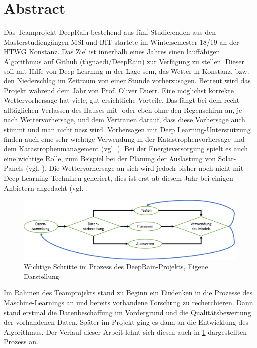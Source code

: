 
\section{Abstract}
Das Teamprojekt DeepRain bestehend aus fünf Studierenden aus den Masterstudiengängen MSI und BIT startete im Wintersemester 18/19 an der HTWG Konstanz. Das Ziel ist innerhalb eines Jahres einen lauffähigen Algorithmus auf Github (thgnaedi/DeepRain) zur Verfügung zu stellen. Dieser soll mit Hilfe von Deep Learning in der Lage sein, das Wetter in Konstanz, bzw. den Niederschlag im Zeitraum von einer Stunde vorherzusagen. Betreut wird das Projekt während dem Jahr von Prof. Oliver Duerr. 
Eine möglichst korrekte Wettervorhersage hat viele, gut ersichtliche Vorteile. Das fängt bei dem recht alltäglichen Verlassen des Hauses mit- oder eben ohne den Regenschirm an, je nach Wettervorhersage, und dem Vertrauen darauf, dass diese Vorhersage auch stimmt und man nicht nass wird. Vorhersagen mit Deep Learning-Unterstützung finden auch eine sehr wichtige Verwendung in der Katastrophenvorhersage und dem Katastrophenmanagement (vgl. \cite[S. 763]{Hanif.2019}). Bei der Energieversorgung spielt es auch eine wichtige Rolle, zum Beispiel bei der Planung der Auslastung von Solar-Panels (vgl. \cite[S. 2]{AndreGensleret.al..}). Die Wettervorhersage an sich wird jedoch bisher noch nicht mit Deep Learning-Techniken generiert, dies ist erst ab diesem Jahr bei einigen Anbietern angedacht (vgl. \cite{ChristophFrohlich.2019}. 
\begin{figure}[ht]
\centering
\includegraphics[width=\linewidth]{pics/Deep_learning_prozess}
\caption{Wichtige Schritte im Prozess des DeepRain-Projekts, Eigene Darstellung}
\label{fig:deepLearningProcess}
\end{figure}
Im Rahmen des Teamprojekts stand zu Beginn ein Eindenken in die Prozesse des Maschine-Learnings an und bereits vorhandene Forschung zu recherchieren. Dann stand erstmal die Datenbeschaffung im Vordergrund und die Qualitätsbewertung der vorhandenen Daten. Später im Projekt ging es dann an die Entwicklung des Algorithmus. Der Verlauf dieser Arbeit lehnt sich diesen auch in \ref{fig:deepLearningProcess} dargestellten Prozess an. 

